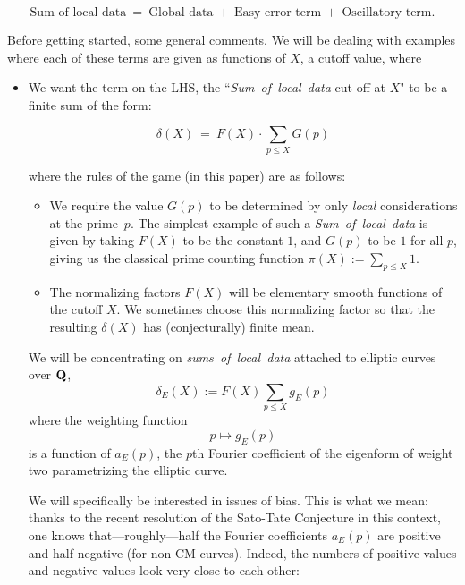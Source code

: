 \documentclass[11pt]{article}
\theoremstyle{plain}
\theoremstyle{definition}
\numberwithin{equation}{section}
\numberwithin{figure}{section}
\numberwithin{table}{section}
\def\Q{\bf{Q}}
\begin{document}
{\Large $${\text{Sum of local data}}  \ = \  {\text{Global data}}\ +\  {\text{Easy error term}}\ +\  {\text{Oscillatory term}}.$$ }

Before getting started, some general comments. We will be dealing with examples where each of these terms are given as functions of $X$, a cutoff value, where

\begin{itemize}\item We want the term on the LHS,   the {``{\it Sum\ of\ local\ data} cut off at $X$"} to be  a finite sum of the form:

  $$\delta(X) \ = \ F(X)\cdot \sum_{p\le X}G(p)$$

  where the rules of the game (in this paper) are as follows:

  \begin{itemize} \item We require the value $G(p)$ to be determined by only {\it local }considerations at the prime~$p$.
The simplest example of such a {\it Sum\ of\ local\ data}  is given by taking $F(X)$ to be the constant $1$, and  $G(p)$ to be  $1$ for all $p$, giving us the classical prime counting function $\pi(X):=\sum_{p\le X}1$. \item The normalizing factors $F(X)$ will be elementary smooth functions of the cutoff $X$. We sometimes choose this normalizing factor so that the  resulting  $\delta(X)$ has (conjecturally) finite mean.\end{itemize}

We will be concentrating on  {\it sums\ of\ local\ data}  attached to elliptic curves over ${\Q}$,   $$\delta_E(X):=F(X)\sum_{p\le X}g_E(p)$$ where the weighting function $$p \mapsto g_E(p)$$   is a function of $a_E(p)$, the $p$th Fourier coefficient of the eigenform of weight two parametrizing the elliptic curve.

  We will specifically be interested in  issues of bias. This is what we mean: thanks to the recent resolution \cite{} of the Sato-Tate Conjecture in this context, one knows that---roughly---half the Fourier coefficients  $a_E(p)$ are positive and half negative (for non-CM curves).  Indeed, the numbers of positive values and negative values look very close to each other:
\vskip20pt


\end{itemize}
\end{document}
